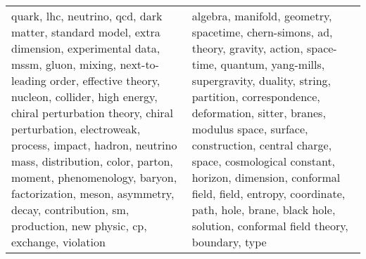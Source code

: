 \begin{longtable}{p{7cm}|p{7cm}}
\bottomrule
\endlastfoot
quark, lhc, neutrino, qcd, dark matter, standard model, extra dimension, experimental data, mssm, gluon, mixing, next-to-leading order, effective theory, nucleon, collider, high energy, chiral perturbation theory, chiral perturbation, electroweak, process, impact, hadron, neutrino mass, distribution, color, parton, moment, phenomenology, baryon, factorization, meson, asymmetry, decay, contribution, sm, production, new physic, cp, exchange, violation & algebra, manifold, geometry, spacetime, chern-simons, ad, theory, gravity, action, space-time, quantum, yang-mills, supergravity, duality, string, partition, correspondence, deformation, sitter, branes, modulus space, surface, construction, central charge, space, cosmological constant, horizon, dimension, conformal field, field, entropy, coordinate, path, hole, brane, black hole, solution, conformal field theory, boundary, type \\
\end{longtable}

